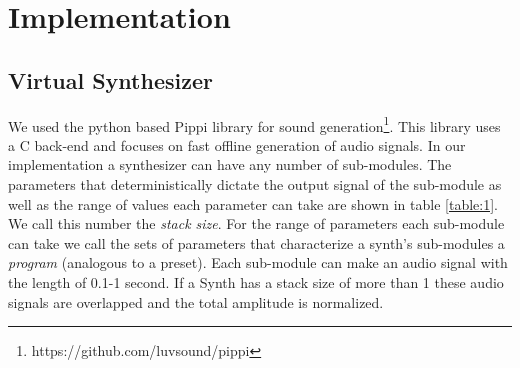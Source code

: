 \documentclass{nime-alternate} %
\begin{document}
\section{Implementation}
\label{impl}
\subsection{Virtual Synthesizer}
We used the python based Pippi library for sound generation\footnote{https://github.com/luvsound/pippi}. This library uses a C back-end and focuses on fast offline generation of audio signals. In our implementation a synthesizer can have any number of sub-modules. The parameters that deterministically dictate the output signal of the sub-module as well as the range of values each parameter can take are shown in table \ref{table:1}. We call this number the \textit{stack size}. For the range of parameters each sub-module can take we call the sets of parameters that characterize a synth's sub-modules a \textit{program} (analogous to a preset).  Each sub-module can make an audio signal with the length of 0.1-1 second. If a Synth has a stack size of more than 1 these audio signals are overlapped and the total amplitude is normalized.\\
\begin{table}[h!]
\centering
{}
\caption{Synthesizer Sub-module Parameters. Despite the simplicity of the parameters and our efforts at constraining the ranges, the number of parameters that can be randomly chosen for each sub-module is in the order of $10^{15}$ }
\label{table:1}
\end{table}
\end{document}
